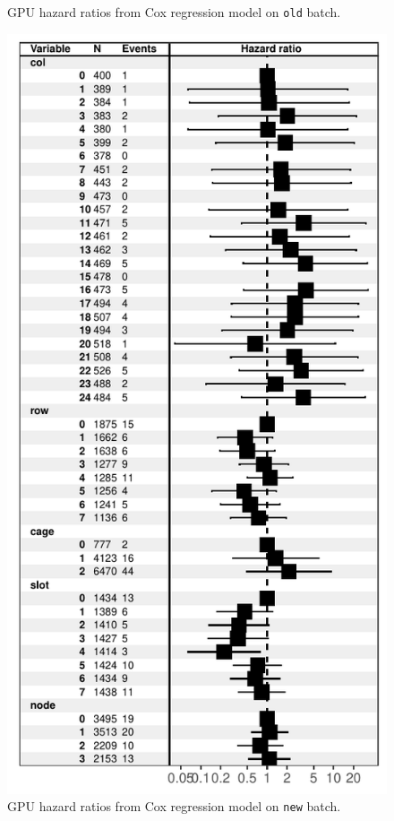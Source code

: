 \begin{figure}
  \caption{GPU hazard ratios from Cox regression model on {\tt old}
    batch.}
  \label{fig:cox-old}
\end{figure}
\begin{figure}
  \centering
  \includegraphics[width=\columnwidth]{figs/cox_n001.pdf}
  \caption{GPU hazard ratios from Cox regression model on {\tt new}
    batch.}
  \label{fig:cox-new}
\end{figure}

